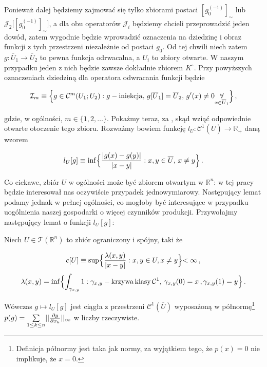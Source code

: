 	Ponieważ dalej będziemy zajmować się tylko zbiorami postaci $[g_0^{(-1)}]_{\sim}$ lub $\mathcal{J}_{2}\Big[ [g_0^{(-1)}]_{\sim}\Big]$, a dla obu operatorów $\mathcal{J}_{i}$ będziemy chcieli przeprowadzić jeden dowód, zatem wygodnie będzie wprowadzić oznaczenia na dziedzinę i obraz funkcji z tych przestrzeni niezależnie od postaci $g_0$. Od tej chwili niech zatem $g: \overline{U}_1 \rightarrow	\overline{U}_2$ to pewna funkcja odrwacalna, a $U_i$ to zbiory otwarte. W naszym przypadku jeden z nich będzie zawsze dokładnie zbiorem $K^{\circ}$. Przy powyższych oznaczeniach dziedziną dla operatora odwracania funkcji będzie 


\begin{equation*}
	\mathcal{I}_{m} \equiv \Bigl\{ g \in \mathcal{C}^{m}(U_1;U_2): g - \mathrm{iniekcja},\, g[\overline{U}_1] = \overline{U}_2,\, g'(x) \not = 0 \underset{x\in \overline{U}_1}{\forall}   \Bigl\}\,,
\end{equation*}

	gdzie, w ogólności, $m \in \{1, 2, \dots\}$. Pokażmy teraz, za \citet{Lanza1}, skąd wziąć odpowiednie otwarte otoczenie tego zbioru. Rozważmy bowiem funkcję $ l_U : \mathcal{C}^{1}(\overline{U}) \rightarrow \mathbb{R}_{+} $ daną wzorem

\begin{equation}\label{l_function}
	l_U [g] \equiv \inf \Bigl\{ \frac{|g(x) - g(y)|}{|x-y|} : x, y \in \overline{U}, \, x \not= y \Bigl\}\,.
\end{equation}

Co ciekawe, zbiór $ U $ w ogólności może być zbiorem otwartym w $ \mathbb{R}^n $: w tej pracy będzie interesował nas oczywiście przypadek jednowymiarowy. Następujący lemat podamy jednak w pełnej ogólności, co mogłoby być interesujące w przypadku uogólnienia naszej gospodarki o więcej czynników produkcji. Przywołajmy następujący lemat \citep[][Str. 107, lemat 4.29]{Lanza1} o funkcji $ l_{U}[g] $: 
 
\begin{lemat}\label{continuous in c1}

Niech $ U \in \mathcal{T}(\mathbb{R}^n) $ to zbiór ograniczony i spójny, taki że 

$$ c[U] \equiv \sup \Bigl\{  \frac{\lambda(x,y)}{|x-y|} : x,y \in U, x \not= y \Bigl\} < \infty\,,$$
$$ \lambda(x,y) = \inf\Bigl\{ \int_{\gamma_{x,y}}1 : \gamma_{x,y} - \mathrm{krzywa\,klasy\,}\mathcal{C}^1, \, \gamma_{x,y}(0)=x \,, \gamma_{x,y}(1)=y \Bigl\}\,. $$ 

Wówczas $ g \mapsto l_U [g] $ jest ciągła z przestrzeni $ \mathcal{C}^1 (\overline{U}) $ wyposażoną w półnormę\footnote{Definicja półnormy jest taka jak normy, za wyjątkiem tego, że $ p(x) = 0$ nie implikuje, że $ x = 0 $.} $ p(g) = \underset{1 \leq k \leq n}{\sum} || \frac{\partial g}{\partial x_k} ||_{\infty}$ w liczby rzeczywiste.

\end{lemat}

